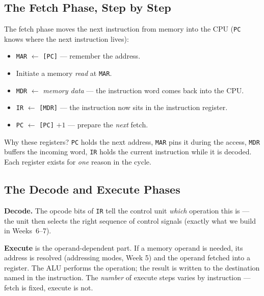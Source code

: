 \documentclass[11pt]{article}
\begin{document}
\subsection{The Fetch Phase, Step by Step}

The fetch phase moves the next instruction from memory into the CPU (\texttt{PC} knows where the next instruction lives):
\begin{itemize}
  \item \texttt{MAR} $\gets$ \texttt{[PC]} --- remember the address.
  \item Initiate a memory \emph{read} at \texttt{MAR}.
  \item \texttt{MDR} $\gets$ \emph{memory data} --- the instruction word comes back into the CPU.
  \item \texttt{IR} $\gets$ \texttt{[MDR]} --- the instruction now sits in the instruction register.
  \item \texttt{PC} $\gets$ \texttt{[PC]} $+ 1$ --- prepare the \emph{next} fetch.
\end{itemize}

Why these registers? \texttt{PC} holds the next address, \texttt{MAR} pins it during the access, \texttt{MDR} buffers the incoming word, \texttt{IR} holds the current instruction while it is decoded. Each register exists for \emph{one} reason in the cycle.

\subsection{The Decode and Execute Phases}

\textbf{Decode.} The opcode bits of \texttt{IR} tell the control unit \emph{which} operation this is --- the unit then selects the right sequence of control signals (exactly what we build in Weeks~6--7).

\textbf{Execute} is the operand-dependent part. If a memory operand is needed, its address is resolved (addressing modes, Week 5) and the operand fetched into a register. The ALU performs the operation; the result is written to the destination named in the instruction. The \emph{number} of execute steps varies by instruction --- fetch is fixed, execute is not.
\end{document}
